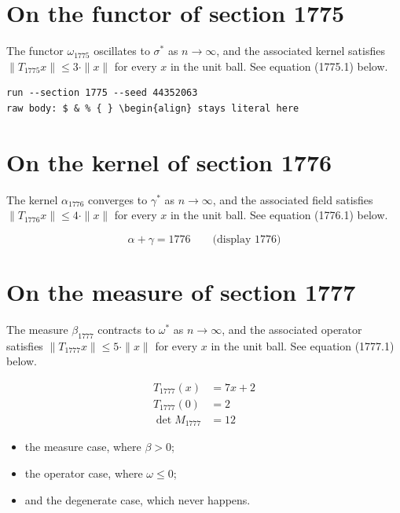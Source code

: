 \documentclass{article}
\begin{document}
\section{On the functor of section 1775}
The functor $\omega_{1775}$ oscillates to $\sigma^{*}$ as $n \to \infty$,
and the associated kernel satisfies $\|T_{1775} x\| \leq 3 \cdot \|x\|$
for every $x$ in the unit ball. See equation (1775.1) below.

\begin{verbatim}
run --section 1775 --seed 44352063
raw body: $ & % { } \begin{align} stays literal here
\end{verbatim}

\section{On the kernel of section 1776}
The kernel $\alpha_{1776}$ converges to $\gamma^{*}$ as $n \to \infty$,
and the associated field satisfies $\|T_{1776} x\| \leq 4 \cdot \|x\|$
for every $x$ in the unit ball. See equation (1776.1) below.

$$
\alpha + \gamma = 1776 \qquad \text{(display 1776)}
$$

\section{On the measure of section 1777}
The measure $\beta_{1777}$ contracts to $\omega^{*}$ as $n \to \infty$,
and the associated operator satisfies $\|T_{1777} x\| \leq 5 \cdot \|x\|$
for every $x$ in the unit ball. See equation (1777.1) below.

\begin{align}
T_{1777}(x) &= 7 x + 2 \\
T_{1777}(0) &= 2 \\
\det M_{1777} &= 12
\end{align}

\begin{itemize}
  \item the measure case, where $\beta > 0$;
  \item the operator case, where $\omega \leq 0$;
  \item and the degenerate case, which never happens.
\end{itemize}
\end{document}
